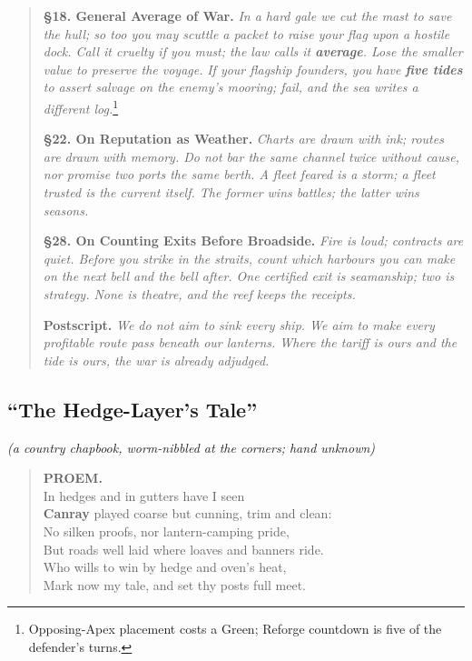 \documentclass[11pt]{article}
\begin{document}
\begin{quote}
\medskip
\textbf{§18. General Average of War.} \emph{In a hard gale we cut the mast to save the hull; so too you may scuttle a packet to raise your flag upon a hostile dock. Call it cruelty if you must; the law calls it \textbf{average}. Lose the smaller value to preserve the voyage.} \emph{If your flagship founders, you have \textbf{five tides} to assert salvage on the enemy’s mooring; fail, and the sea writes a different log.}\footnote{Opposing-Apex placement costs a Green; Reforge countdown is five of the defender’s turns.}

\medskip
\textbf{§22. On Reputation as Weather.} \emph{Charts are drawn with ink; routes are drawn with memory. Do not bar the same channel twice without cause, nor promise two ports the same berth. A fleet feared is a storm; a fleet trusted is the current itself. The former wins battles; the latter wins seasons.}

\medskip
\textbf{§28. On Counting Exits Before Broadside.} \emph{Fire is loud; contracts are quiet. Before you strike in the straits, count which harbours you can make on the next bell and the bell after. One certified exit is seamanship; two is strategy. None is theatre, and the reef keeps the receipts.}

\medskip
\textbf{Postscript.} \emph{We do not aim to sink every ship. We aim to make every profitable route pass beneath our lanterns. Where the tariff is ours and the tide is ours, the war is already adjudged.}
\end{quote}

\clearpage

\subsection{“The Hedge-Layer’s Tale”}
\emph{(a country chapbook, worm-nibbled at the corners; hand unknown)}

\begin{verse}
\textbf{PROEM.}\\
In hedges and in gutters have I seen\\
\textbf{Canray} played coarse but cunning, trim and clean:\\
No silken proofs, nor lantern-camping pride,\\
But roads well laid where loaves and banners ride.\\
Who wills to win by hedge and oven’s heat,\\
Mark now my tale, and set thy posts full meet.
\end{verse}
\end{document}
